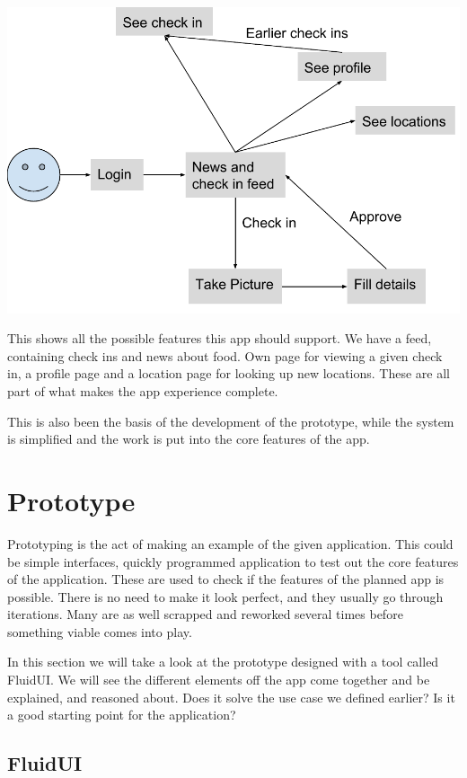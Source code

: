 \documentclass[12pt]{article}
\begin{document}
\includegraphics[width=16cm]{pictures/usecase}
\bigbreak

This shows all the possible features this app should support. We have a feed,
containing check ins and news about food. Own page for viewing a given check in,
a profile page and a location page for looking up new locations. These are all
part of what makes the app experience complete.

This is also been the basis of the development of the prototype, while the
system is simplified and the work is put into the core features of the app.


\section{Prototype}

Prototyping is the act of making an example of the given application. This
could be simple interfaces, quickly programmed application to test out the core
features of the application. These are used to check if the features of the
planned app is possible. There is no need to make it look perfect, and they
usually go through iterations. Many are as well scrapped and reworked several
times before something viable comes into play.

In this section we will take a look at the prototype designed with a tool called
FluidUI. We will see the different elements off the app come together and be
explained, and reasoned about. Does it solve the use case we defined earlier? Is
it a good starting point for the application?



\subsection{FluidUI}
\end{document}
